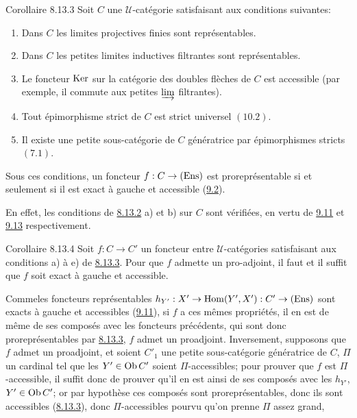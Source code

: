 \documentclass[10pt]{../fichiers-configuration-latex/smfart}
\def\labelenumi{(\theenumi)}
\begin{document}
\begin{enonce*}{Corollaire 8.13.3}
Soit $C$ une $𝒰$-catégorie satisfaisant aux conditions
suivantes:
\begin{enumerate}
\renewcommand{\theenumi}{\alph{enumi}}
\renewcommand{\labelenumi}{\theenumi)}
\item Dans $C$ les limites projectives finies sont représentables.

\item Dans $C$ les petites limites inductives filtrantes sont
représentables.

\item Le foncteur $\operatorname{Ker}$ sur la catégorie des doubles flèches de
$C$ est accessible (par exemple, il commute aux petites $\varinjlim$
filtrantes).

\item Tout épimorphisme strict de $C$ est strict universel $(10.2)$.

\item Il existe une petite sous-catégorie de $C$ génératrice par
épimorphismes stricts $(7.1)$.
\end{enumerate}
Sous ces conditions, un foncteur $f:C\rightarrow (\operatorname{Ens})$ est
proreprésentable si et seulement si il est exact à gauche et
accessible (\hyperref[I.def9.2]{9.2}).
\end{enonce*}

En effet, les conditions de \hyperref[I.prop8.13.2]{8.13.2} a) et b) sur $C$ sont
vérifiées, en vertu de \hyperref[I.prop9.11]{9.11} et \hyperref[I.prop9.13]{9.13}
respectivement.


\begin{enonce*}{Corollaire 8.13.4}
Soit $f:C\rightarrow C'$ un foncteur entre $𝒰$-catégories
satisfaisant aux conditions {\rm a)} à {\rm e)} de \hyperref[I.cor8.13.3]{8.13.3}. Pour
que $f$ admette un pro-adjoint, il faut et il suffit que $f$ soit
exact à gauche et accessible.
\end{enonce*}

Comme\pageoriginale les foncteurs représentables
$h_{Y'}:X'\rightarrow \operatorname{Hom}(Y',X'):C'\rightarrow(\operatorname{Ens})$ sont exacts à
gauche et accessibles (\hyperref[I.prop9.11]{9.11}), si $f$ a ces mêmes
propriétés, il en est de même de ses composés avec les foncteurs
précédents, qui sont donc proreprésentables par \hyperref[I.cor8.13.3]{8.13.3},
\ie $f$ admet un proadjoint. Inversement, supposons que $f$ admet un
proadjoint, et soient $C'_1$ une petite sous-catégorie génératrice
de $C$, $\Pi$ un cardinal tel que les $Y'\in \operatorname{Ob} C'$ soient
$\Pi$-accessibles; pour prouver que $f$ est $\Pi$-accessible, il
suffit donc de prouver qu'il en est ainsi de ses composés avec les
$h_{Y'}$, $Y'\in \operatorname{Ob} C'$; or par hypothèse ces composés sont
proreprésentables, donc ils sont accessibles (\hyperref[I.cor8.13.3]{8.13.3}),
donc $\Pi$-accessibles pourvu qu'on prenne $\Pi$ assez grand, \cqfd
\end{document}
